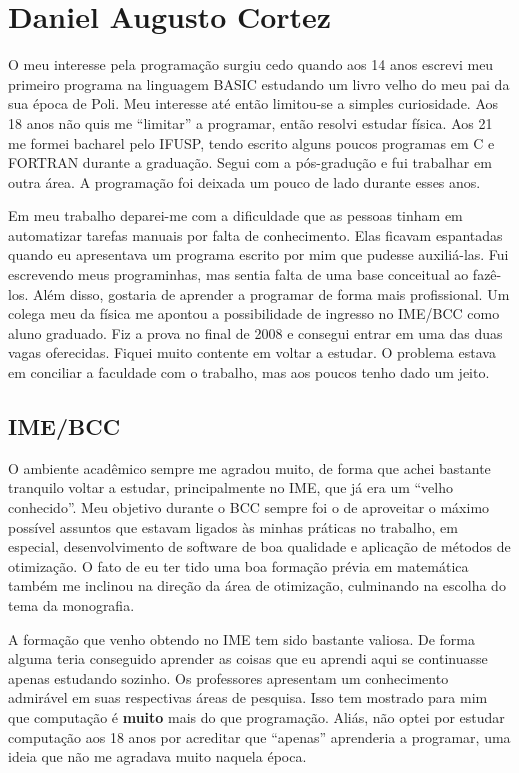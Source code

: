 \section{Daniel Augusto Cortez}
\label{sec:daniel_subjetiva}

O meu interesse pela programação surgiu cedo quando aos 14 anos escrevi meu primeiro programa na
linguagem BASIC estudando um livro velho do meu pai da sua época de Poli. Meu interesse até então
limitou-se a simples curiosidade. Aos 18 anos não quis me ``limitar'' a programar, então resolvi
estudar física. Aos 21 me formei bacharel pelo IFUSP, tendo escrito alguns poucos programas em C e
FORTRAN durante a graduação. Segui com a pós-gradução e fui trabalhar em outra área. A programação
foi deixada um pouco de lado durante esses anos.

Em meu trabalho deparei-me com a dificuldade que as pessoas tinham em automatizar tarefas manuais
por falta de conhecimento. Elas ficavam espantadas quando eu apresentava um programa escrito por mim
que pudesse auxiliá-las. Fui escrevendo meus programinhas, mas sentia falta de uma base conceitual
ao fazê-los. Além disso, gostaria de aprender a programar de forma mais profissional. Um colega meu
da física me apontou a possibilidade de ingresso no IME/BCC como aluno graduado. Fiz a prova no
final de 2008 e consegui entrar em uma das duas vagas oferecidas. Fiquei muito contente em voltar a
estudar. O problema estava em conciliar a faculdade com o trabalho, mas aos poucos tenho dado um
jeito.

\subsection{IME/BCC}

O ambiente acadêmico sempre me agradou muito, de forma que achei bastante tranquilo voltar a
estudar, principalmente no IME, que já era um ``velho conhecido''. Meu objetivo durante o BCC sempre
foi o de aproveitar o máximo possível assuntos que estavam ligados às minhas práticas no trabalho,
em especial, desenvolvimento de software de boa qualidade e aplicação de métodos de otimização. O
fato de eu ter tido uma boa formação prévia em matemática também me inclinou na direção da área de 
otimização, culminando na escolha do tema da monografia.

A formação que venho obtendo no IME tem sido bastante valiosa. De forma alguma teria conseguido
aprender as coisas que eu aprendi aqui se continuasse apenas estudando sozinho. Os professores
apresentam um conhecimento admirável em suas respectivas áreas de pesquisa. Isso tem mostrado para
mim que computação é {\bf muito} mais do que programação. Aliás, não optei por estudar computação
aos 18 anos por acreditar que ``apenas'' aprenderia a programar, uma ideia que não me agradava muito
naquela época.


